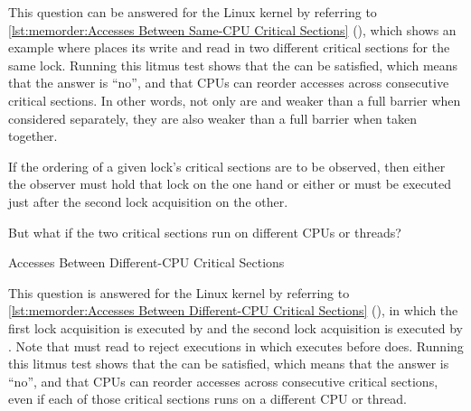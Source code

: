 This question can be answered for the Linux kernel by referring to
\cref{lst:memorder:Accesses Between Same-CPU Critical Sections}
(), which
shows an example where  places its write and read in two
different critical sections for the same lock.
Running this litmus test shows that the  can be satisfied,
which means that the answer is ``no'', and that CPUs can reorder accesses
across consecutive critical sections.
In other words, not only are  and 
weaker than a full barrier when considered separately, they are also
weaker than a full barrier when taken together.

If the ordering of a given lock's critical sections are to be observed,
then either the observer must hold that lock on the one hand or either
 or 
must be executed just after the second lock acquisition on the other.

But what if the two critical sections run on different CPUs or threads?

\begin{listing}

\caption{Accesses Between Different-CPU Critical Sections}
\label{lst:memorder:Accesses Between Different-CPU Critical Sections}
\end{listing}

This question is answered for the Linux kernel by referring to
\cref{lst:memorder:Accesses Between Different-CPU Critical Sections}
(),
in which the first lock acquisition is executed by  and the
second lock acquisition is executed by .
Note that  must read  to reject executions in which
 executes before  does.
Running this litmus test shows that the  can be satisfied,
which means that the answer is ``no'', and that CPUs can reorder accesses
across consecutive critical sections, even if each of those critical
sections runs on a different CPU or thread.

